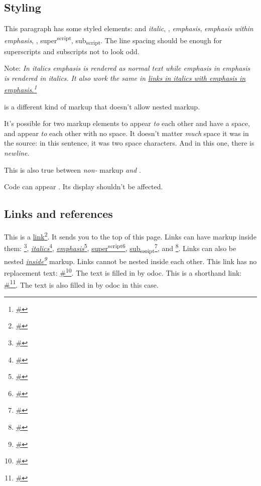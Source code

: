 \subsection{Styling\label{styling}}%
This paragraph has some styled elements:  and \emph{italic}, , \emph{emphasis}, \emph{\emph{emphasis} within emphasis}, , super\textsuperscript{script}, sub\textsubscript{script}. The line spacing should be enough for superscripts and subscripts not to look odd.

Note: \emph{In italics \emph{emphasis} is rendered as normal text while \emph{emphasis \emph{in} emphasis} is rendered in italics.} \emph{It also work the same in \href{\#}{links in italics with \emph{emphasis \emph{in} emphasis}.}\footnote{\url{\#}}}

 is a different kind of markup that doesn't allow nested markup.

It's possible for two markup elements to appear  \emph{to} each other and have a space, and appear \emph{to} each other with no space. It doesn't matter  \emph{much} space it was in the source: in this sentence, it was two space characters. And in this one, there is  \emph{newline}.

This is also true between \emph{non-} markup \emph{and} .

Code can appear . Its display shouldn't be affected.

\subsection{Links and references\label{links-and-references}}%
This is a \href{\#}{link}\footnote{\url{\#}}. It sends you to the top of this page. Links can have markup inside them: \href{\#}{}\footnote{\url{\#}}, \href{\#}{\emph{italics}}\footnote{\url{\#}}, \href{\#}{\emph{emphasis}}\footnote{\url{\#}}, \href{\#}{super\textsuperscript{script}}\footnote{\url{\#}}, \href{\#}{sub\textsubscript{script}}\footnote{\url{\#}}, and \href{\#}{}\footnote{\url{\#}}. Links can also be nested \emph{\href{\#}{inside}\footnote{\url{\#}}} markup. Links cannot be nested inside each other. This link has no replacement text: \href{\#}{\#}\footnote{\url{\#}}. The text is filled in by odoc. This is a shorthand link: \href{\#}{\#}\footnote{\url{\#}}. The text is also filled in by odoc in this case.

